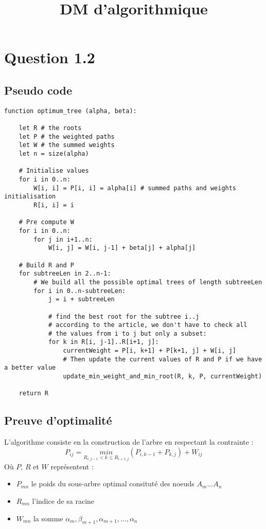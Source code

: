 \documentclass{article}
\begin{document}
%
\title{DM d'algorithmique}

%
\maketitle              %

%
%
%
\section{Question 1.2}
\subsection{Pseudo code}

\begin{verbatim}
function optimum_tree (alpha, beta):

    let R # the roots
    let P # the weighted paths
    let W # the summed weights
    let n = size(alpha)

    # Initialise values
    for i in 0..n:
        W[i, i] = P[i, i] = alpha[i] # summed paths and weights initialisation
        R[i, i] = i
    
    # Pre compute W
    for i in 0..n:
        for j in i+1..n:
            W[i, j] = W[i, j-1] + beta[j] + alpha[j]
    
    # Build R and P
    for subtreeLen in 2..n-1:
        # We build all the possible optimal trees of length subtreeLen
        for i in 0..n-subtreeLen:
            j = i + subtreeLen

            # find the best root for the subtree i..j
            # according to the article, we don't have to check all 
            # the values from i to j but only a subset:
            for k in R[i, j-1]..R[i+1, j]:
                currentWeight = P[i, k+1] + P[k+1, j] + W[i, j]
                # Then update the current values of R and P if we have a better value
                update_min_weight_and_min_root(R, k, P, currentWeight)
    
    return R
\end{verbatim}

\subsection{Preuve d'optimalité} 

L'algorithme consiste en la construction de l'arbre en respectant la contrainte :
\begin{equation}
    P_{ij} = \underset{R_{i,j-1}<k\leq R_{i+1,j}}{min}(P_{i,k - 1} + P_{k,j}) + W_{ij}
\end{equation}
Où $P$, $R$ et $W$ représentent :
\begin{itemize}
 \item $P_{mn}$ le poids du sous-arbre optimal consituté des noeuds $A_m...A_n$
\item $R_{mn}$ l'indice de sa racine 
\item $W_{mn}$ la somme $\alpha_m, \beta_{m+1}, \alpha_{m+1}, ... , \alpha_{n}$
\end{itemize}
\end{document}
